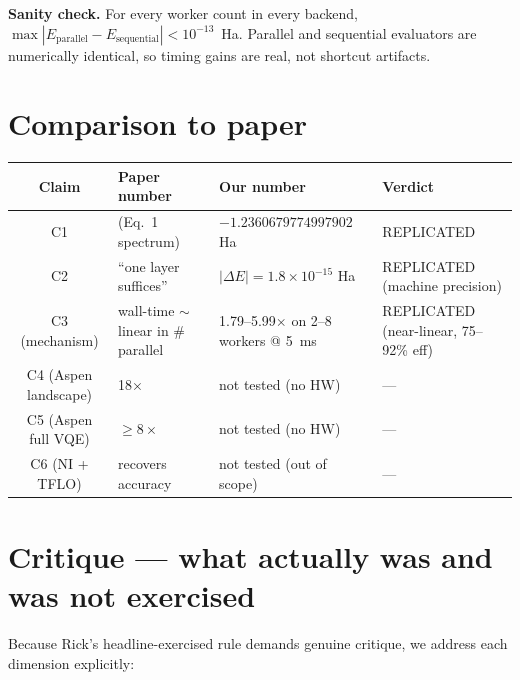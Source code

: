 \documentclass[11pt]{article}
\begin{document}
\textbf{Sanity check.} For every worker count in every backend, $\max|E_{\mathrm{parallel}} - E_{\mathrm{sequential}}| < 10^{-13}$~Ha. Parallel and sequential evaluators are numerically identical, so timing gains are real, not shortcut artifacts.

\section{Comparison to paper}

\begin{tabular}{@{}clll@{}}
\toprule
Claim & Paper number & Our number & Verdict \\
\midrule
C1 & (Eq.~1 spectrum) & $-1.2360679774997902$ Ha & REPLICATED \\
C2 & ``one layer suffices'' & $|\Delta E| = 1.8 \times 10^{-15}$ Ha & REPLICATED (machine precision) \\
C3 (mechanism) & wall-time $\sim$ linear in \# parallel & 1.79--5.99$\times$ on 2--8 workers @ 5~ms & REPLICATED (near-linear, 75--92\% eff) \\
C4 (Aspen landscape) & 18$\times$ & not tested (no HW) & --- \\
C5 (Aspen full VQE) & $\geq 8\times$ & not tested (no HW) & --- \\
C6 (NI + TFLO) & recovers accuracy & not tested (out of scope) & --- \\
\bottomrule
\end{tabular}

\section{Critique --- what actually was and was not exercised}

Because Rick's headline-exercised rule demands genuine critique, we address each dimension explicitly:
\end{document}
